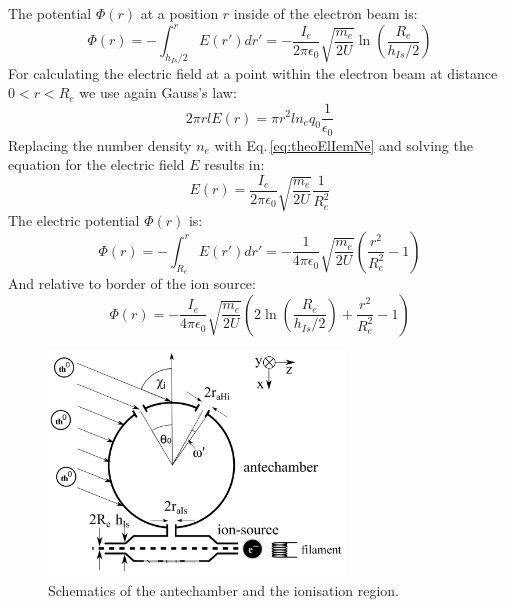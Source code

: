 		The potential $\Phi (r)$ at a position $r$ inside of the electron beam is:
		\begin{equation}
			\Phi (r) = -\int_{h_{Is}/2}^{r} E(r') dr' = -\frac{I_e}{2\pi\epsilon_0}\sqrt{\frac{m_e}{2U}}\ln\left(\frac{R_e}{h_{Is}/2}\right)
		\end{equation}
		For calculating the electric field at a point within the electron beam at distance $0<r<R_e$ we use again Gauss's law:
		\begin{equation}
			2\pi r l E(r) = \pi r^2 l n_e q_0 \frac{1}{\epsilon_0}
		\end{equation}
		Replacing the number density $n_e$ with Eq.\,\eqref{eq:theoElIemNe} and solving the equation for the electric field $E$ results in:
		\begin{equation}
			E(r) = \frac{I_e}{2\pi\epsilon_0}\sqrt{\frac{m_e}{2U}}\frac{1}{R_e^2}
		\end{equation}
		The electric potential $\Phi (r)$ is:
		\begin{equation}
			\Phi (r) = -\int_{R_e}^{r} E(r') dr' = -\frac{1}{4\pi\epsilon_0}\sqrt{\frac{m_e}{2U}}\left(\frac{r^2}{R_e^2} -1 \right)
		\end{equation}
		And relative to border of the ion source:
		\begin{equation}
			\Phi(r) = -\frac{I_e}{4\pi\epsilon_0}\sqrt{\frac{m_e}{2U}}\left(2\ln\left(\frac{R_e}{h_{Is}/2}\right) +\frac{r^2}{R_e^2} -1 \right)
			\label{eq:elPotIem}
		\end{equation}
	
		\begin{figure}[h]
			\centering
			\includegraphics[width= 0.7\textwidth]{Bilder/particleDensEnh.png}
			\caption{Schematics of the antechamber and the ionisation region.}
			\label{fig:thAntIs}
		\end{figure}
		
